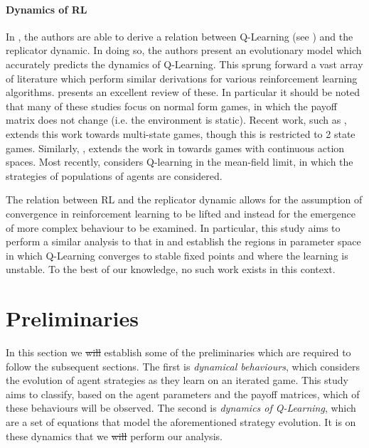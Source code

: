 \documentclass[sigconf]{aamas}
\begin{document}
\paragraph{Dynamics of RL} In \cite{Tuyls2006AnGames}, the authors are able to derive a relation between Q-Learning (see \cite{Barber2012}) and the replicator dynamic. In doing so, the authors present an evolutionary model which accurately predicts the dynamics of Q-Learning. This sprung forward a vast array of literature which perform similar derivations for various reinforcement learning algorithms. \cite{Bloembergen2015} presents an excellent review of these. In particular it should be noted that many of these studies focus on normal form games, in which the payoff matrix does not change (i.e. the environment is static). Recent work, such as \cite{Hennes2008}, extends this work towards multi-state games, though this is restricted to 2 state games. Similarly, \cite{Galstyan2013}, extends the work in \cite{Tuyls2006AnGames} towards games with continuous action spaces. Most recently, \cite{Hu2019} considers Q-learning in the mean-field limit, in which the strategies of populations of agents are considered. 

The relation between RL and the replicator dynamic allows for the assumption of convergence in reinforcement learning to be lifted and instead for the emergence of more complex behaviour to be examined. In particular, this study aims to perform a similar analysis to that in \cite{Sanders2018} and establish the regions in parameter space in which Q-Learning converges to stable fixed points and where the learning is unstable. To the best of our knowledge, no such work exists in this context. 

\section{Preliminaries}

In this section we \st{will} establish some of the preliminaries which are
required to follow the subsequent sections. The first is \textit{dynamical behaviours}, 
which considers the evolution of agent strategies as they
learn on an iterated game. This study aims to classify, based on the
agent parameters and the payoff matrices, which of these behaviours
will be observed. The second is \textit{dynamics of Q-Learning}, which are a set
of equations that model the aforementioned strategy evolution. It is
on these dynamics that we \st{will} perform our analysis.
\end{document}
